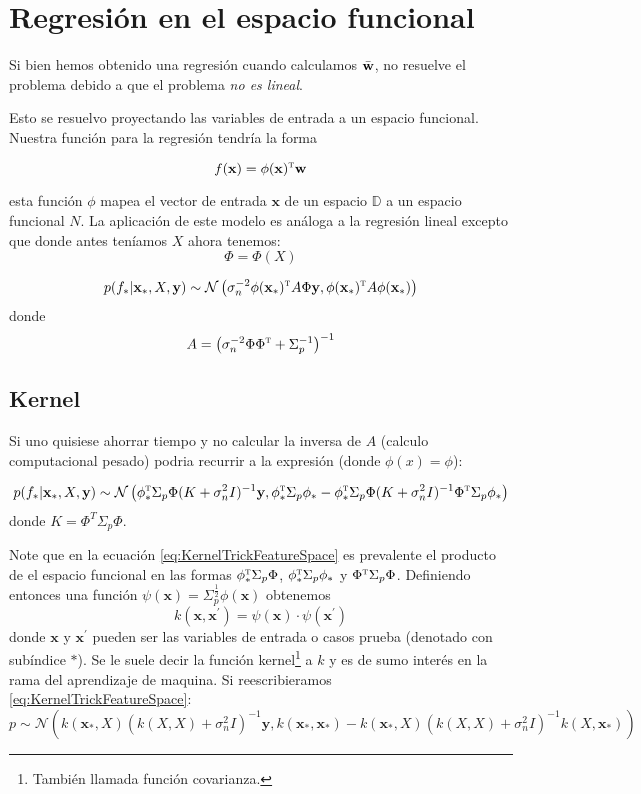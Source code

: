 \documentclass{article}
\newcommand{\vectorbold}[1]{\mathbf{#1}}
\newcommand{\Dim}{\mathbb{D}}
\newcommand{\T}{\textsc{t}}
\newcommand{\func}{f}
\newcommand{\GD}{\mathcal{N}}
\newcommand{\sn}{\sigma_{n}}
\newcommand{\xbold}{\vectorbold{x}}
\begin{document}
\section{Regresión en el espacio funcional}
Si bien hemos obtenido una regresión cuando calculamos $\Bar{\vectorbold{w}}$, no resuelve el problema debido a que el problema \textit{no es lineal}. 

Esto se  resuelvo proyectando las variables de entrada a un espacio funcional. Nuestra función para la regresión tendría la forma

\begin{equation}
    \func(\vectorbold{x}) = \phi (\vectorbold{x})^{\T} \vectorbold{w}
\end{equation}

esta función $\phi$ mapea el vector de entrada $\vectorbold{x}$ de un espacio $\Dim$ a un espacio funcional $N$. La aplicación de este modelo es análoga a la regresión lineal excepto que donde antes teníamos $X$ ahora tenemos:
\[
\Phi =\Phi(X)
\]

\begin{equation} \label{eq:FeatureSpaceProb1}
    p(f_*|\vectorbold{x}_*,X,\vectorbold{y})\sim \GD \left(\sigma_{n}^{-2}\phi(\vectorbold{x}_*)^\T A\Phi\vectorbold{y},\phi(\vectorbold{x}_*)^\T A\phi(\vectorbold{x}_*) \right)
\end{equation}
donde
\[
A =\left(\sigma_n^{-2}\Phi \Phi^\T +\Sigma_p^{-1}\right)^{-1}
\]
\subsection{Kernel}
Si uno quisiese ahorrar tiempo y no calcular la inversa de $A$ (calculo computacional pesado) podria recurrir a la expresión (donde $\phi(x)=\phi$):

\begin{equation} \label{eq:KernelTrickFeatureSpace}
        p(f_*|\vectorbold{x}_*,X,\vectorbold{y})\sim \GD \left(\phi_*^\T \Sigma_p \Phi (K+\sn^2I)^{-1}\vectorbold{y},\phi_*^\T \Sigma_p \phi_* -\phi^\T_* \Sigma_p\Phi(K+\sn^2I)^{-1}\Phi^\T \Sigma_p\phi_* \right)
\end{equation}
donde $K=\Phi^T\Sigma_p\Phi$.

Note que en la ecuación \ref{eq:KernelTrickFeatureSpace} es prevalente el producto de el espacio funcional en las formas $\phi_*^\T \Sigma_p \Phi$,  $\phi_*^\T \Sigma_p \phi_*$ y $\Phi^\T \Sigma_p\Phi$. Definiendo entonces una función $\psi(\xbold)=\Sigma_p^{\frac{1}{2}}\phi(\xbold)$ obtenemos
\begin{equation}
    k(\xbold,\xbold^{\prime}) = \psi(\xbold)\cdot \psi(\xbold^\prime)
\end{equation}
donde $\xbold$ y $\xbold^\prime$ pueden ser las variables de entrada o casos prueba (denotado con subíndice $*$). Se le suele decir la función kernel\footnote{También llamada función covarianza.} a $k$ y es de sumo interés en la rama del aprendizaje de maquina. Si reescribieramos \ref{eq:KernelTrickFeatureSpace}:
\begin{equation}\label{eq:KernelTrickSubstituted}
p\sim \GD \left(k(\xbold_*,X) (k(X,X)+\sn^2I)^{-1}\vectorbold{y},k(\xbold_*,\xbold_*) -k(\xbold_*,X)(k(X,X)+\sn^2I)^{-1}k(X,\xbold_*) \right)
\end{equation}
\end{document}
